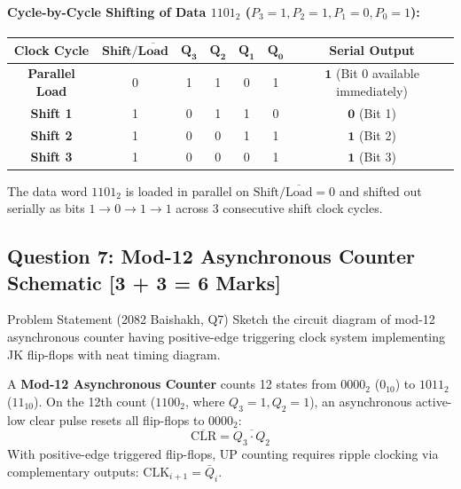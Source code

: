 \documentclass[11pt,a4paper,oneside]{book}
\begin{document}
\paragraph{Cycle-by-Cycle Shifting of Data $1101_2$ ($P_3=1, P_2=1, P_1=0, P_0=1$):}
\begin{center}
\begin{tabular}{|c|c|cccc|c|}
\hline
\textbf{Clock Cycle} & $\mathbf{\text{Shift}/\overline{\text{Load}}}$ & $\mathbf{Q_3}$ & $\mathbf{Q_2}$ & $\mathbf{Q_1}$ & $\mathbf{Q_0}$ & \textbf{Serial Output} \\ \hline
\textbf{Parallel Load} & 0 & 1 & 1 & 0 & 1 & $\mathbf{1}$ (Bit 0 available immediately) \\ \hline
\textbf{Shift 1} & 1 & 0 & 1 & 1 & 0 & $\mathbf{0}$ (Bit 1) \\ \hline
\textbf{Shift 2} & 1 & 0 & 0 & 1 & 1 & $\mathbf{1}$ (Bit 2) \\ \hline
\textbf{Shift 3} & 1 & 0 & 0 & 0 & 1 & $\mathbf{1}$ (Bit 3) \\ \hline
\end{tabular}
\end{center}

\begin{answerbox}
The data word $1101_2$ is loaded in parallel on $\text{Shift}/\overline{\text{Load}}=0$ and shifted out serially as bits $1 \to 0 \to 1 \to 1$ across 3 consecutive shift clock cycles.
\end{answerbox}

\vspace{0.6cm}

\subsection{Question 7: Mod-12 Asynchronous Counter Schematic [3 + 3 = 6 Marks]}
\begin{questionbox}{Problem Statement (2082 Baishakh, Q7)}
Sketch the circuit diagram of mod-12 asynchronous counter having positive-edge triggering clock system implementing JK flip-flops with neat timing diagram.
\end{questionbox}

A \textbf{Mod-12 Asynchronous Counter} counts 12 states from $0000_2$ ($0_{10}$) to $1011_2$ ($11_{10}$). On the 12th count ($1100_2$, where $Q_3=1, Q_2=1$), an asynchronous active-low clear pulse resets all flip-flops to $0000_2$:
\[
\overline{\text{CLR}} = \overline{Q_3 \cdot Q_2}
\]
With positive-edge triggered flip-flops, UP counting requires ripple clocking via complementary outputs: $\text{CLK}_{i+1} = \bar{Q}_i$.
\end{document}
